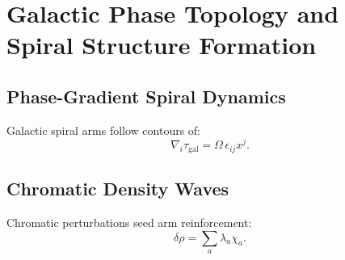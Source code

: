 \chapter{Galactic Phase Topology and Spiral Structure Formation}

\section{Phase-Gradient Spiral Dynamics}
Galactic spiral arms follow contours of:
\[
\nabla_i \tau_{\mathrm{gal}} = \Omega\, \epsilon_{ij} x^j.
\]

\section{Chromatic Density Waves}
Chromatic perturbations seed arm reinforcement:
\[
\delta\rho = \sum_a \lambda_a \chi_a.
\]

